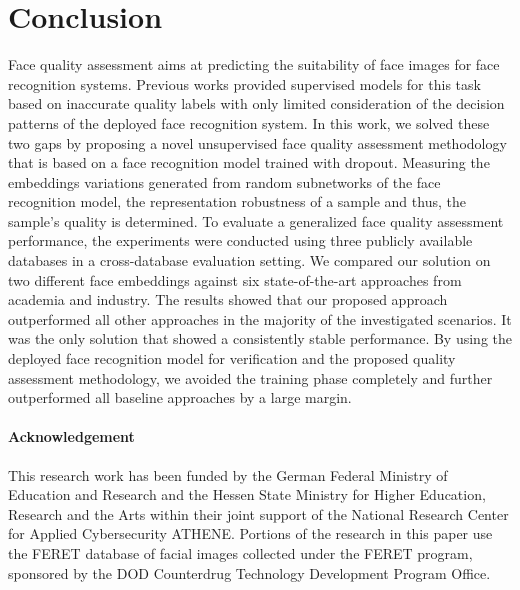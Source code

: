 \documentclass[10pt,twocolumn,letterpaper]{article}
\begin{document}
\section{Conclusion}
Face quality assessment aims at predicting the suitability of face images for face recognition systems.
Previous works provided supervised models for this task based on inaccurate quality labels with only limited consideration of the decision patterns of the deployed face recognition system.
In this work, we solved these two gaps by proposing a novel unsupervised face quality assessment methodology that is based on a face recognition model trained with dropout.
Measuring the embeddings variations generated from random subnetworks of the face recognition model, the representation robustness of a sample and thus, the sample's quality is determined.
To evaluate a generalized face quality assessment performance, the experiments were conducted using three publicly available databases in a cross-database evaluation setting.
We compared our solution on two different face embeddings against six state-of-the-art approaches from academia and industry.
The results showed that our proposed approach outperformed all other approaches in the majority of the investigated scenarios.
It was the only solution that showed a consistently stable performance.
By using the deployed face recognition model for verification and the proposed quality assessment methodology, we avoided the training phase completely and further outperformed all baseline approaches by a large margin.









\paragraph{Acknowledgement} This research work has been funded by the German Federal Ministry of Education and Research and the Hessen State Ministry for Higher Education, Research and the Arts within their joint support of the National Research Center for Applied Cybersecurity ATHENE.
Portions of the research in this paper use the FERET database of facial images collected under the FERET program, sponsored by the DOD Counterdrug Technology Development Program Office.

\clearpage
\newpage

{\small


}
\end{document}
